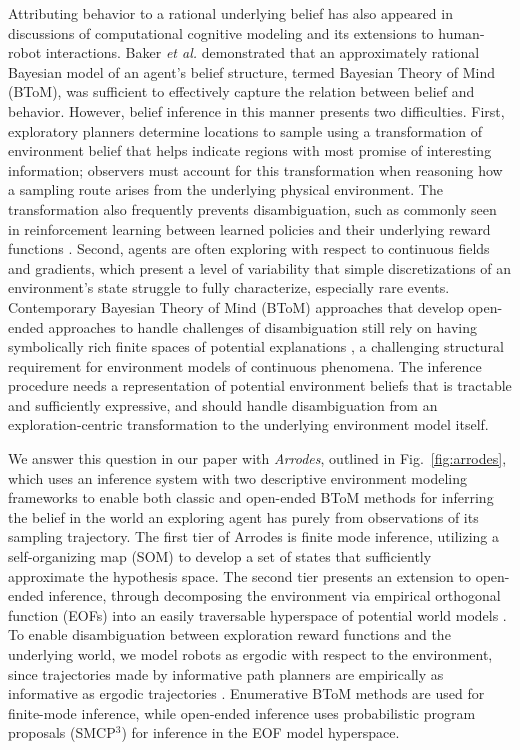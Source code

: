 \documentclass[letterpaper,10pt,conference]{ieeeconf}
\begin{document}
Attributing behavior to a rational underlying belief has also appeared in discussions of computational cognitive modeling and its extensions to human-robot interactions. Baker \emph{et al.} \cite{baker2017rational} demonstrated that an approximately rational Bayesian model of an agent's belief structure, termed Bayesian Theory of Mind (BToM), was sufficient to effectively capture the relation between belief and behavior. However, belief inference in this manner presents two difficulties. First, exploratory planners determine locations to sample using a transformation of environment belief that helps indicate regions with most promise of interesting information; observers must account for this transformation when reasoning how a sampling route arises from the underlying physical environment. The transformation also frequently prevents disambiguation, such as commonly seen in reinforcement learning between learned policies and their underlying reward functions \cite{garg2021iq}. Second, agents are often exploring with respect to continuous fields and gradients, which present a level of variability that simple discretizations of an environment's state struggle to fully characterize, especially rare events. Contemporary Bayesian Theory of Mind (BToM) approaches that develop open-ended approaches to handle challenges of disambiguation still rely on having symbolically rich finite spaces of potential explanations  \cite{ying2023inferring, ying2025belief}, a challenging structural requirement for environment models of continuous phenomena. The inference procedure needs a representation of potential environment beliefs that is tractable and sufficiently expressive, and should handle disambiguation from an exploration-centric transformation to the underlying environment model itself.

We answer this question in our paper with \textit{Arrodes}, outlined in Fig.~\ref{fig:arrodes}, which uses an inference system with two descriptive environment modeling frameworks to enable both classic and open-ended BToM methods for inferring the belief in the world an exploring agent has purely from observations of its sampling trajectory. The first tier of Arrodes is finite mode inference, utilizing a self-organizing map (SOM) \cite{mccammon2024som} to develop a set of states that sufficiently approximate the hypothesis space. The second tier presents an extension to open-ended inference, through decomposing the environment via empirical orthogonal function (EOFs) into an easily traversable hyperspace of potential world models \cite{young2024greedy}. To enable disambiguation between exploration reward functions and the underlying world, we model robots as ergodic with respect to the environment, since trajectories made by informative path planners are empirically as informative as ergodic trajectories \cite{miller2016ergodic, dressel2018optimality}. Enumerative BToM methods are used for finite-mode inference, while open-ended inference uses probabilistic program proposals (SMCP$^{3}$) \cite{lew2023smcp3} for inference in the EOF model hyperspace.
\end{document}
